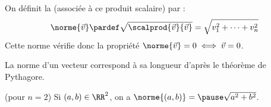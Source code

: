\documentclass[french,xcolor=svgnames]{beamer}
\begin{document}
\begin{frame}
  On définit la  (associée à ce produit scalaire) par :
  \begin{equation*}
    \norme {\vec v} \pardef \sqrt{\scalprod{\vec v}{\vec v}} = \sqrt{v_{1}^{2}  + \cdots + v_{n}^{2}}
  \end{equation*}\pause
  Cette norme vérifie donc la propriété \(\norme{\vec v} = 0 \iff \vec v = 0\).\pause

  \begin{remark*}
    La \og norme\fg{} d'un vecteur correspond à sa \og longueur\fg{} d'après le théorème de Pythagore.
  \end{remark*}\pause

  \begin{example}
    (pour \(n = 2\)) Si \((a,b) \in \RR^2\),\pause{} on a \(\norme{(a,b)} =\pause \sqrt{a^{2} + b^{2}}\).
  \end{example}
\end{frame}
\end{document}
